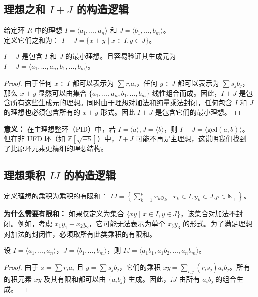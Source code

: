 \documentclass[11pt]{article}
\begin{document}
\subsection{理想之和 $I+J$ 的构造逻辑}
\begin{cndefinition}[理想之和]
给定环 $R$ 中的理想 $I = \langle a_1, \dots, a_n \rangle$ 和 $J = \langle b_1, \dots, b_m \rangle$。\\
定义它们之和为： $I+J = \{x + y \mid x \in I, y \in J\}$。
\end{cndefinition}
\begin{cnproperty}
$I+J$ 是包含 $I$ 和 $J$ 的最小理想。且容易验证其生成元为 $I+J = \langle a_1, \dots, a_n, b_1, \dots, b_m \rangle$。
\end{cnproperty}
\begin{proof}
由于任何 $x \in I$ 都可以表示为 $\sum r_i a_i$，任何 $y \in J$ 都可以表示为 $\sum s_j b_j$，那么 $x+y$ 显然可以由集合 $\{a_1, \dots, a_n, b_1, \dots, b_m\}$ 线性组合而成。因此，$I+J$ 是包含所有这些生成元的理想。同时由于理想对加法和纯量乘法封闭，任何包含 $I$ 和 $J$ 的理想也必须包含所有的 $x+y$ 形式。因此 $I+J$ 是包含它们的最小理想。
\end{proof}
\noindent \textbf{意义：} 在主理想整环（PID）中，若 $I=\langle a \rangle, J=\langle b \rangle$，则 $I+J = \langle \text{gcd}(a,b) \rangle$。但在非 UFD 环（如 $\mathbb{Z}[\sqrt{-5}]$）中，$I+J$ 可能不再是主理想，这说明我们找到了比原环元素更精细的理想结构。

\subsection{理想乘积 $IJ$ 的构造逻辑}
\begin{cndefinition}[理想乘积]
定义理想的乘积为乘积的有限和： $IJ = \left\{ \sum_{k=1}^{p} x_k y_k \mid x_k \in I, y_k \in J, p \in \mathbb{N}_+ \right\}$。
\end{cndefinition}
\noindent \textbf{为什么需要有限和：} 如果仅定义为集合 $\{xy \mid x \in I, y \in J\}$，该集合对加法不封闭。例如，考虑 $x_1 y_1 + x_2 y_2$，它可能无法表示为单个 $x_3 y_3$ 的形式。为了满足理想对加法的封闭性，必须取所有此类乘积的有限和。
\begin{cnproperty}
设 $I = \langle a_1, \dots, a_n \rangle$，$J = \langle b_1, \dots, b_m \rangle$，则 $IJ = \langle a_1 b_1, a_1 b_2, \dots, a_n b_m \rangle$。
\end{cnproperty}
\begin{proof}
由于 $x = \sum r_i a_i$ 且 $y = \sum s_j b_j$，它们的乘积 $xy = \sum_{i,j} (r_i s_j) a_i b_j$。所有的积元素 $xy$ 及其有限和都可以由 $\{a_i b_j\}$ 生成。因此，$IJ$ 由所有 $a_i b_j$ 的组合生成。
\end{proof}
\end{document}
